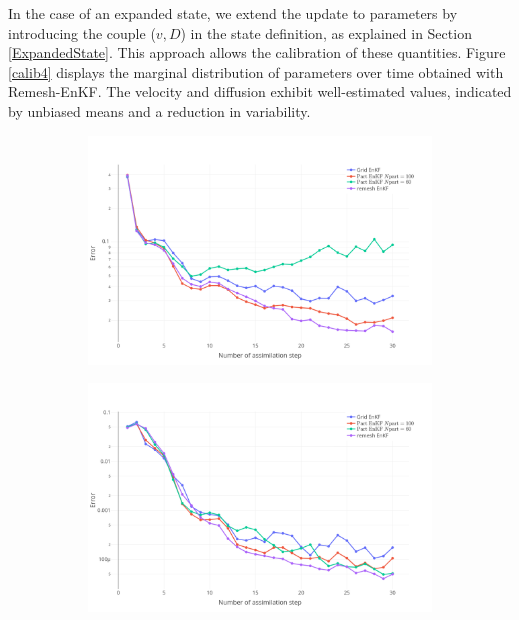 In the case of an expanded state, we extend the update to parameters by introducing the couple ($v, D$) in the state definition, as explained in Section \ref{ExpandedState}. This approach allows the calibration of these quantities.
Figure \ref{calib4} displays the marginal distribution of parameters over time obtained with Remesh-EnKF. The velocity and diffusion exhibit well-estimated values, indicated by unbiased means and a reduction in variability.

\begin{figure}[ht]
	\centering
	\begin{subfigure}{0.49\textwidth}
		\includegraphics[width=\textwidth]{images/app1d/w_calibration/state_error.png}
		\caption{}
		\label{calib1}
	\end{subfigure}
	\hfill
	\begin{subfigure}{0.49\textwidth}
		\includegraphics[width=\textwidth]{images/app1d/w_calibration/velocity_error.png}

\end{subfigure}
\end{figure}
